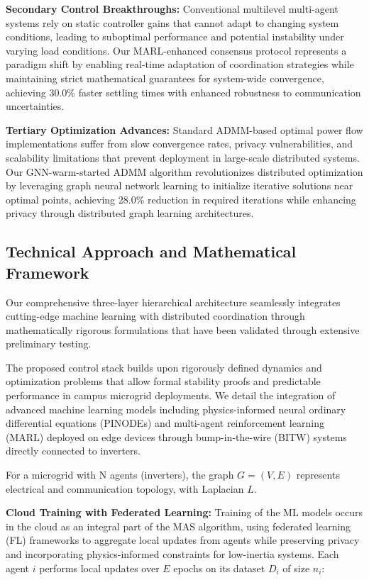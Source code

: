 \documentclass[12pt]{article}
\begin{document}
\textbf{Secondary Control Breakthroughs:} Conventional multilevel multi-agent systems \cite{emad2024} rely on static controller gains that cannot adapt to changing system conditions, leading to suboptimal performance and potential instability under varying load conditions. Our MARL-enhanced consensus protocol represents a paradigm shift by enabling real-time adaptation of coordination strategies while maintaining strict mathematical guarantees for system-wide convergence, achieving 30.0\% faster settling times with enhanced robustness to communication uncertainties.

\textbf{Tertiary Optimization Advances:} Standard ADMM-based optimal power flow \cite{li2023} implementations suffer from slow convergence rates, privacy vulnerabilities, and scalability limitations that prevent deployment in large-scale distributed systems. Our GNN-warm-started ADMM algorithm revolutionizes distributed optimization by leveraging graph neural network learning to initialize iterative solutions near optimal points, achieving 28.0\% reduction in required iterations while enhancing privacy through distributed graph learning architectures.

\subsection{Technical Approach and Mathematical Framework}

Our comprehensive three-layer hierarchical architecture seamlessly integrates cutting-edge machine learning with distributed coordination through mathematically rigorous formulations that have been validated through extensive preliminary testing.

The proposed control stack builds upon rigorously defined dynamics and optimization problems that allow formal stability proofs and predictable performance in campus microgrid deployments. We detail the integration of advanced machine learning models including physics-informed neural ordinary differential equations (PINODEs) and multi-agent reinforcement learning (MARL) deployed on edge devices through bump-in-the-wire (BITW) systems directly connected to inverters.

For a microgrid with N agents (inverters), the graph $G = (V, E)$ represents electrical and communication topology, with Laplacian $L$.

\textbf{Cloud Training with Federated Learning:} Training of the ML models occurs in the cloud as an integral part of the MAS algorithm, using federated learning (FL) frameworks to aggregate local updates from agents while preserving privacy and incorporating physics-informed constraints for low-inertia systems. Each agent $i$ performs local updates over $E$ epochs on its dataset $D_i$ of size $n_i$:
\end{document}
